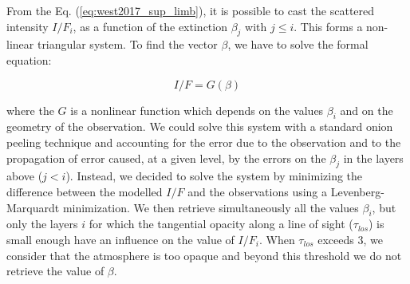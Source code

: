 From the Eq. (\ref{eq:west2017_sup_limb}), it is possible to cast the scattered intensity $I/F_i$, as a function of
the extinction $\beta_j$ with $j \le i$. This forms a non-linear triangular system. To find the vector $\beta$, we
have to solve the formal equation:

\begin{equation}
    I/F = G(\beta)
\end{equation}

where the ${G}$ is a nonlinear function which depends on the values $\beta_i$ and on the geometry of the observation.
We could solve this system with a standard onion peeling technique and accounting for the error due to the observation
and to the propagation of error caused, at a given level, by the errors on the $\beta_j$ in the layers above ($j<i$).
Instead, we decided to solve the system by minimizing the difference between the modelled  $I/F$ and the observations
using a Levenberg-Marquardt minimization. We then retrieve simultaneously all the values $\beta_i$, but only the layers $i$
for which the tangential opacity along a line of sight ($\tau_{los}$) is small enough have an influence on the value
of $I/F_i$. When $\tau_{los}$ exceeds 3, we consider that the atmosphere is too opaque and beyond this threshold we
do not retrieve the value of $\beta$.
